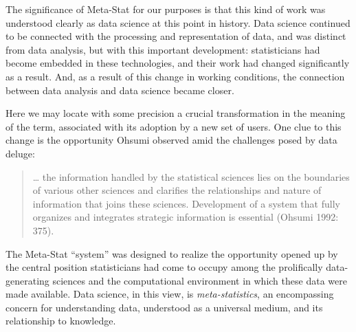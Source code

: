 \documentclass[
  letterpaper,
]{report}
\begin{document}
The significance of Meta-Stat for our purposes is that this kind of work
was understood clearly as data science at this point in history. Data
science continued to be connected with the processing and representation
of data, and was distinct from data analysis, but with this important
development: statisticians had become embedded in these technologies,
and their work had changed significantly as a result. And, as a result
of this change in working conditions, the connection between data
analysis and data science became closer.

Here we may locate with some precision a crucial transformation in the
meaning of the term, associated with its adoption by a new set of users.
One clue to this change is the opportunity Ohsumi observed amid the
challenges posed by data deluge:

\begin{quote}
\ldots{} the information handled by the statistical sciences lies on the
boundaries of various other sciences and clarifies the relationships and
nature of information that joins these sciences. Development of a system
that fully organizes and integrates strategic information is essential
(Ohsumi 1992: 375).
\end{quote}

The Meta-Stat ``system'' was designed to realize the opportunity opened
up by the central position statisticians had come to occupy among the
prolifically data-generating sciences and the computational environment
in which these data were made available. Data science, in this view, is
\emph{meta-statistics}, an encompassing concern for understanding data,
understood as a universal medium, and its relationship to knowledge.
\end{document}

